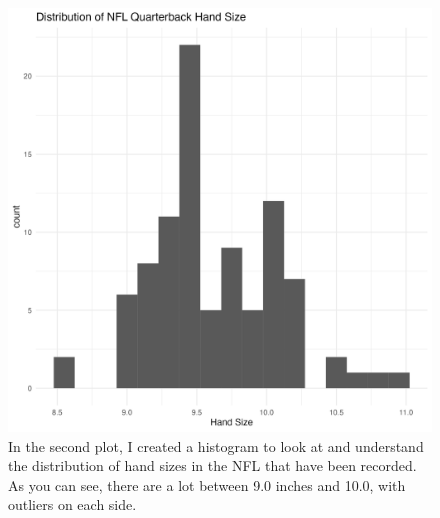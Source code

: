 \documentclass{article}
\begin{document}
\begin{figure}
    \centering
    \includegraphics{PS6b_Jones.png}
    \caption{In the second plot, I created a histogram to look at and understand the distribution of hand sizes in the NFL that have been recorded. As you can see, there are a lot between 9.0 inches and 10.0, with outliers on each side. }
    \label{fig:my_label}
\end{figure}
\end{document}

